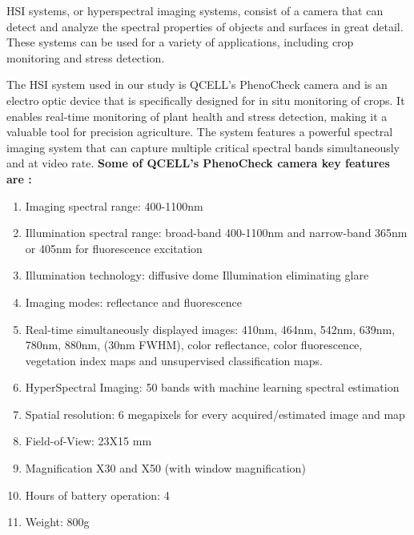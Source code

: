\documentclass{article}
\begin{document}
{                        \hspace{0.5cm}HSI systems, or hyperspectral imaging systems, consist of a camera that can detect and analyze the spectral properties of objects and surfaces in great detail.     These systems can be used for a variety of applications, including crop monitoring and stress detection.\par
                        The HSI system used in our study is QCELL’s PhenoCheck camera and is an electrooptic device that is specifically designed for in situ monitoring of crops. It enables   real-time monitoring of plant health and stress detection, making it a valuable tool for precision agriculture. The system features a powerful spectral imaging system that can capture multiple critical spectral bands simultaneously and at video rate.
                        \textbf{Some of QCELL's PhenoCheck camera key features are :}\par
                        \renewcommand{\theenumi}{\roman{enumi}}%
                        \begin{enumerate}
                            \item  Imaging spectral range: 400-1100nm
                            \item  Illumination spectral range: broad-band 400-1100nm and narrow-band 365nm or 405nm for fluorescence excitation
                            \item  Illumination technology: diffusive dome Illumination eliminating glare
                            \item  Imaging modes: reflectance and fluorescence
                            \item  Real-time simultaneously displayed images: 410nm, 464nm, 542nm, 639nm, 780nm, 880nm, (30nm FWHM), color reflectance, color fluorescence, vegetation index maps        and unsupervised classification maps.
                            \item  HyperSpectral Imaging: 50 bands with machine learning spectral estimation
                            \item  Spatial resolution: 6 megapixels for every acquired/estimated image and map
                            \item  Field-of-View: 23X15 mm
                            \item  Magnification X30 and X50 (with window magnification)
                            \item  Hours of battery operation: 4
                            \item  Weight: 800g

\end{enumerate}}
\end{document}
